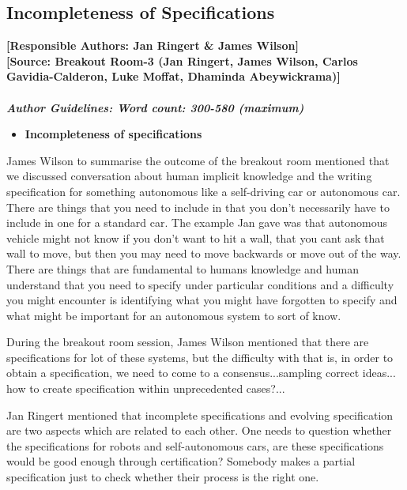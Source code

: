 \documentclass[sigconf]{acmart}
\begin{document}
\subsection{Incompleteness of Specifications}
\noindent\textbf{[Responsible Authors:  Jan Ringert \& James Wilson]}\\
\noindent \textbf{[Source: Breakout Room-3 (Jan Ringert, James Wilson, Carlos Gavidia-Calderon, Luke Moffat, Dhaminda Abeywickrama)]}\\\\
\noindent\textbf{\textit{Author Guidelines: Word count: 300-580 (maximum)}}\\

\begin{itemize}
	\item \textbf{Incompleteness of specifications}
\end{itemize}
James Wilson to summarise the outcome of the breakout room mentioned that we discussed conversation about human implicit knowledge and the writing specification for something autonomous like a self-driving car or autonomous car. There are things that you need to include in that you don't necessarily have to include in one for a standard car. The example Jan gave was that autonomous vehicle might not know if you don't want to hit a wall, that you cant ask that wall to move, but then you may need to move backwards or move out of the way. There are things that are fundamental to humans knowledge and human understand that you need to specify under particular conditions and a difficulty you might encounter is identifying what you might have forgotten to specify and what might be important for an autonomous system to sort of know. 

During the breakout room session, James Wilson mentioned that there are specifications for lot of these systems, but the difficulty with that is, in order to obtain a specification, we need to come to a consensus...sampling correct ideas... how to create specification within unprecedented cases?...

Jan Ringert mentioned that incomplete specifications and evolving specification are two aspects which are related to each other. 
One needs to question whether the specifications for robots and self-autonomous cars, are these specifications would be good enough through certification? Somebody makes a partial specification just to check whether their process is the right one. 
\end{document}
